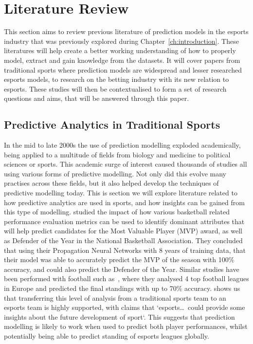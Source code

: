 \chapter{Literature Review}\label{ch:literaturereview}
This section aims to review previous literature of prediction models in the esports industry that was previously explored during Chapter~\ref{ch:introduction}.
These literatures will help create a better working understanding of how to properly model, extract and gain knowledge from the datasets.
It will cover papers from traditional sports where prediction models are widespread and lesser researched esports models, to research on the betting industry with its new relation to esports.
These studies will then be contextualised to form a set of research questions and aims, that will be answered through this paper.

\section{Predictive Analytics in Traditional Sports}\label{sec:TradSports}
In the mid to late 2000s the use of prediction modelling exploded academically, being applied to a multitude of fields from biology and medicine to political sciences or sports.
This academic surge of interest caused thousands of studies all using various forms of predictive modelling.
Not only did this evolve many practises across these fields, but it also helped develop the techniques of predictive modelling today.
This is section we will explore literature related to how predictive analytics are used in sports, and how insights can be gained from this type of modelling.
\citet{sarlis2020sports} studied the impact of how various basketball related performance evaluation metrics can be used to identify dominant attributes that will help predict candidates for the Most Valuable Player (MVP) award, as well as Defender of the Year in the National Basketball Association.
They concluded that using their Propagation Neural Networks with 8 years of training data, that their model was able to accurately predict the MVP of the season with 100\% accuracy, and could also predict the Defender of the Year.
Similar studies have been performed with football such as~\citet{pantzalis2020sports}, where they analysed 4 top football leagues in Europe and predicted the final standings with up to 70\% accuracy.
\citet{scelles2021peculiar} shows us that transferring this level of analysis from a traditional sports team to an esports team is highly supported, with claims that `esports\ldots~could provide some insights about the future development of sport`.
This suggests that prediction modelling is likely to work when used to predict both player performances, whilst potentially being able to predict standing of esports leagues globally. \\

